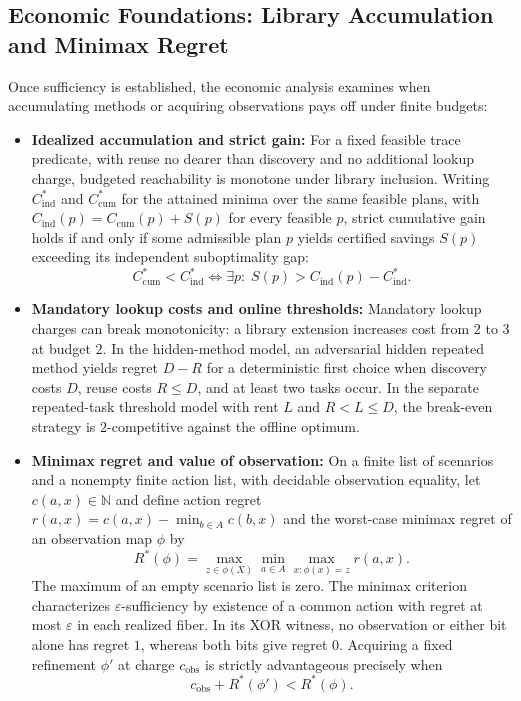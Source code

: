\subsection{Economic Foundations: Library Accumulation and Minimax Regret}
Once sufficiency is established, the economic analysis examines when accumulating methods or acquiring observations pays off under finite budgets:
\begin{itemize}
    \item \textbf{Idealized accumulation and strict gain:} For a fixed feasible trace predicate, with reuse no dearer than discovery and no additional lookup charge, budgeted reachability is monotone under library inclusion. Writing $C_{\mathrm{ind}}^*$ and $C_{\mathrm{cum}}^*$ for the attained minima over the same feasible plans, with $C_{\mathrm{ind}}(p)=C_{\mathrm{cum}}(p)+S(p)$ for every feasible $p$, strict cumulative gain holds if and only if some admissible plan $p$ yields certified savings $S(p)$ exceeding its independent suboptimality gap:
    \begin{equation}
    \label{eq:t15}
    C_{\mathrm{cum}}^* < C_{\mathrm{ind}}^* \iff \exists p :\; S(p) > C_{\mathrm{ind}}(p) - C_{\mathrm{ind}}^*.
    \end{equation}
    \item \textbf{Mandatory lookup costs and online thresholds:} Mandatory lookup charges can break monotonicity: a library extension increases cost from $2$ to $3$ at budget $2$. In the hidden-method model, an adversarial hidden repeated method yields regret $D-R$ for a deterministic first choice when discovery costs $D$, reuse costs $R\le D$, and at least two tasks occur. In the separate repeated-task threshold model with rent $L$ and $R<L\le D$, the break-even strategy is $2$-competitive against the offline optimum.
    \item \textbf{Minimax regret and value of observation:} On a finite list of scenarios and a nonempty finite action list, with decidable observation equality, let $c(a,x)\in\mathbb N$ and define action regret $r(a,x) = c(a,x) - \min_{b \in A} c(b,x)$ and the worst-case minimax regret of an observation map $\phi$ by
    \begin{equation}
    \label{eq:t18-regret}
    R^*(\phi) = \max_{z \in \phi(X)} \min_{a \in A} \max_{x : \phi(x)=z} r(a,x).
    \end{equation}
    The maximum of an empty scenario list is zero. The minimax criterion characterizes $\varepsilon$-sufficiency by existence of a common action with regret at most $\varepsilon$ in each realized fiber. In its XOR witness, no observation or either bit alone has regret $1$, whereas both bits give regret $0$. Acquiring a fixed refinement $\phi'$ at charge $c_{\mathrm{obs}}$ is strictly advantageous precisely when
    \begin{equation}
    \label{eq:t18-acq}
    c_{\mathrm{obs}} + R^*(\phi') < R^*(\phi).
    \end{equation}
\end{itemize}

